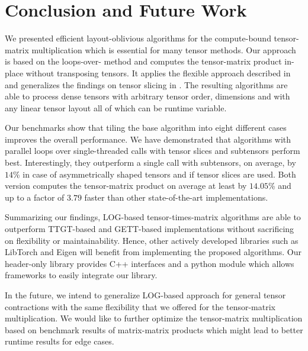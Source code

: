 \section{Conclusion and Future Work}
\label{sec:conclusion}
We presented efficient layout-oblivious algorithms for the compute-bound tensor-matrix multiplication which is essential for many tensor methods.
Our approach is based on the loops-over- method and computes the tensor-matrix product in-place without transposing tensors.
It applies the flexible approach described in \cite{bassoy:2019:ttv} and generalizes the findings on tensor slicing in \cite{li:2015:input}.
The resulting algorithms are able to process dense tensors with arbitrary tensor order, dimensions and with any linear tensor layout all of which can be runtime variable.

Our benchmarks show that tiling the base algorithm into eight different  cases improves the overall performance.
We have demonstrated that algorithms with parallel loops over single-threaded  calls with tensor slices and subtensors perform best.
Interestingly, they outperform a single  call with subtensors, on average, by $14$\% in case of asymmetrically shaped tensors and if tensor slices are used.
Both version computes the tensor-matrix product on average at least by $14.05$\% and up to a factor of $3.79$ faster than other state-of-the-art implementations.


Summarizing our findings, LOG-based tensor-times-matrix algorithms are able to outperform TTGT-based and GETT-based implementations without sacrificing on flexibility or maintainability.
Hence, other actively developed libraries such as LibTorch and Eigen will benefit from implementing the proposed algorithms.
Our header-only library provides C++ interfaces and a python module which allows frameworks to easily integrate our library.

In the future, we intend to generalize LOG-based approach for general tensor contractions with the same flexibility that we offered for the tensor-matrix multiplication. 
We would like to further optimize the tensor-matrix multiplication based on benchmark results of matrix-matrix products which might lead to better runtime results for edge cases.

